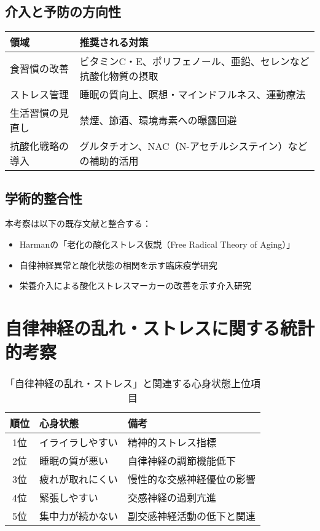 \documentclass[a4paper,12pt]{article}
\begin{document}
\subsection*{介入と予防の方向性}

\begin{table}[H]
\centering
\begin{tabular}{|l|p{10cm}|}
\hline
領域 & 推奨される対策 \\
\hline
食習慣の改善 & ビタミンC・E、ポリフェノール、亜鉛、セレンなど抗酸化物質の摂取 \\
ストレス管理 & 睡眠の質向上、瞑想・マインドフルネス、運動療法 \\
生活習慣の見直し & 禁煙、節酒、環境毒素への曝露回避 \\
抗酸化戦略の導入 & グルタチオン、NAC（N-アセチルシステイン）などの補助的活用 \\
\hline
\end{tabular}
\end{table}

\subsection*{学術的整合性}

本考察は以下の既存文献と整合する：

\begin{itemize}
  \item Harmanの「老化の酸化ストレス仮説（Free Radical Theory of Aging）」
  \item 自律神経異常と酸化状態の相関を示す臨床疫学研究
  \item 栄養介入による酸化ストレスマーカーの改善を示す介入研究
\end{itemize}


\section{自律神経の乱れ・ストレスに関する統計的考察}

\begin{table}[H]
\centering
\begin{tabular}{|c|l|l|}
\hline
順位 & 心身状態 & 備考 \\
\hline
1位 & イライラしやすい & 精神的ストレス指標 \\
2位 & 睡眠の質が悪い & 自律神経の調節機能低下 \\
3位 & 疲れが取れにくい & 慢性的な交感神経優位の影響 \\
4位 & 緊張しやすい & 交感神経の過剰亢進 \\
5位 & 集中力が続かない & 副交感神経活動の低下と関連 \\
\hline
\end{tabular}
\caption{「自律神経の乱れ・ストレス」と関連する心身状態上位項目}
\end{table}
\end{document}
